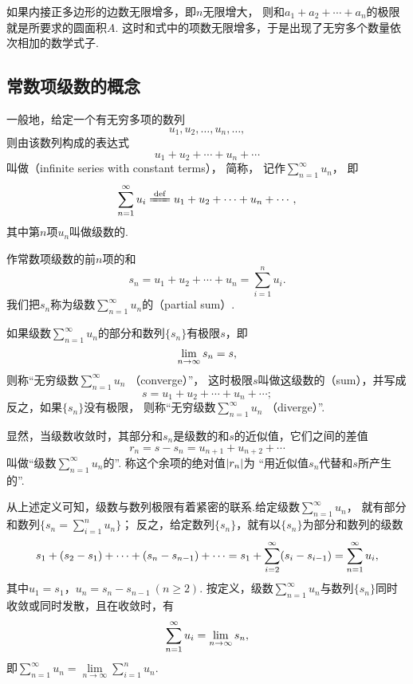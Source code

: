 如果内接正多边形的边数无限增多，即\(n\)无限增大，
则和\(a_1+a_2+\dotsb+a_n\)的极限就是所要求的圆面积\(A\).
这时和式中的项数无限增多，于是出现了无穷多个数量依次相加的数学式子.

\subsection{常数项级数的概念}
\begin{definition}\label{definition:无穷级数.常数项级数的定义}
一般地，给定一个有无穷多项的数列\[
	u_1,u_2,\dotsc,u_n,\dotsc,
\]
则由该数列构成的表达式\[
	u_1+u_2+\dotsb+u_n+\dotsb
\]
叫做（infinite series with constant terms），
简称，
记作\(\sum\limits_{n=1}^\infty u_n\)，
即\[
	\s u_i
	\defeq
	u_1+u_2+\dotsb+u_n+\dotsb,
\]
其中第\(n\)项\(u_n\)叫做级数的.

作常数项级数的前\(n\)项的和\[
	s_n = u_1+u_2+\dotsb+u_n = \sum\limits_{i=1}^n{u_i}.
\]
我们把\(s_n\)称为级数\(\sum\limits_{n=1}^\infty u_n\)的（partial sum）.

如果级数\(\sum\limits_{n=1}^\infty u_n\)的部分和数列\(\{s_n\}\)有极限\(s\)，即\[
	\lim\limits_{n\to\infty} s_n = s,
\]
则称“无穷级数\(\sum\limits_{n=1}^\infty u_n\) （converge）”，
这时极限\(s\)叫做这级数的（sum），并写成\[
	s = u_1+u_2+\dotsb+u_n+\dotsb;
\]
反之，如果\(\{s_n\}\)没有极限，
则称“无穷级数\(\sum\limits_{n=1}^\infty u_n\) （diverge）”.

显然，当级数收敛时，其部分和\(s_n\)是级数的和\(s\)的近似值，它们之间的差值\[
	r_n = s - s_n = u_{n+1}+u_{n+2}+\dotsb
\]
叫做“级数\(\sum\limits_{n=1}^\infty u_n\)的”.
称这个余项的绝对值\(\abs{r_n}\)为%
“用近似值\(s_n\)代替和\(s\)所产生的”.
\end{definition}
从上述定义可知，级数与数列极限有着紧密的联系.给定级数\(\sum\limits_{n=1}^\infty u_n\)，
就有部分和数列\(\{s_n = \sum\limits_{i=1}^n u_n\}\)；
反之，给定数列\(\{s_n\}\)，就有以\(\{s_n\}\)为部分和数列的级数\[
	s_1 + (s_2-s_1) + \dotsb + (s_n-s_{n-1}) + \dotsb
	= s_1 + \sum\limits_{i=2}^\infty (s_i-s_{i-1})
	= \sum\limits_{n=1}^\infty u_i,
\]
其中\(u_1=s_1\)，\(u_n=s_n-s_{n-1}\ (n \geq 2)\).
按定义，级数\(\sum\limits_{n=1}^\infty u_n\)与数列\(\{s_n\}\)同时收敛或同时发散，且在收敛时，有\[
	\sum\limits_{n=1}^\infty u_i = \lim\limits_{n\to\infty} s_n,
\]
即\(\sum\limits_{n=1}^\infty u_n = \lim\limits_{n\to\infty} \sum\limits_{i=1}^n u_n\).

